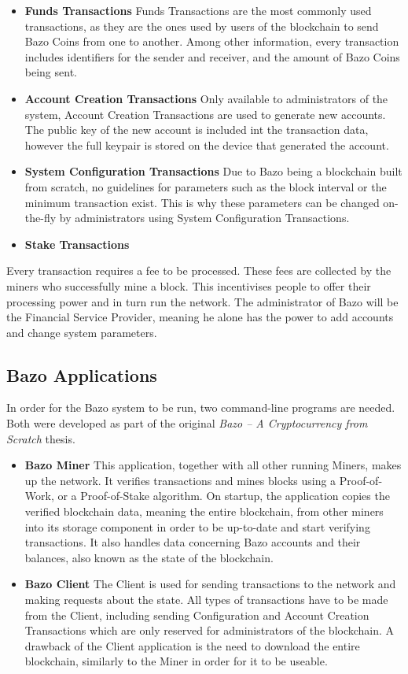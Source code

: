 \begin{itemize}
\item \textbf{Funds Transactions}
Funds Transactions are the most commonly used transactions, as they are the ones used by users of the blockchain to send Bazo Coins from one to another. Among other information, every transaction includes identifiers for the sender and receiver, and the amount of Bazo Coins being sent.
\item \textbf{Account Creation Transactions}
Only available to administrators of the system, Account Creation Transactions are used to generate new accounts. The public key of the new account is included int the transaction data, however the full keypair is stored on the device that generated the account.
\item \textbf{System Configuration Transactions}
Due to Bazo being a blockchain built from scratch, no guidelines for parameters such as the block interval or the minimum transaction exist. This is why these parameters can be changed on-the-fly by administrators using System Configuration Transactions.
\item \textbf{Stake Transactions}
\end{itemize}

Every transaction requires a fee to be processed. These fees are collected by the miners who successfully mine a block. This incentivises people to offer their processing power and in turn run the network. The administrator of Bazo will be the Financial Service Provider, meaning he alone has the power to add accounts and change system parameters.

\subsection{Bazo Applications}
In order for the Bazo system to be run, two command-line programs are needed. Both were developed as part of the original \emph{Bazo -- A Cryptocurrency from Scratch} \cite{bazo} thesis.

\begin{itemize}
\item \textbf{Bazo Miner}
This application, together with all other running Miners, makes up the network. It verifies transactions and mines blocks using a Proof-of-Work, or a Proof-of-Stake algorithm. On startup, the application copies the verified blockchain data, meaning the entire blockchain, from other miners into its storage component in order to be up-to-date and start verifying transactions. It also handles data concerning Bazo accounts and their balances, also known as the state of the blockchain.

\item \textbf{Bazo Client}
The Client is used for sending transactions to the network and making requests about the state. All types of transactions have to be made from the Client, including sending Configuration and Account Creation Transactions which are only reserved for administrators of the blockchain. A drawback of the Client application is the need to download the entire blockchain, similarly to the Miner in order for it to be useable.
\end{itemize}

